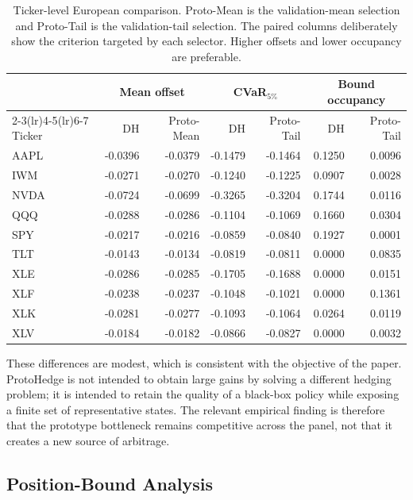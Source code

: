 \documentclass[sigconf]{acmart}
\begin{document}
\begin{table}[t]
\centering
\small
\setlength{\tabcolsep}{4.5pt}
\begin{tabular}{lrrrrrr}
\toprule
& \multicolumn{2}{c}{Mean offset} & \multicolumn{2}{c}{CVaR$_{5\%}$} &
\multicolumn{2}{c}{Bound occupancy} \\
\cmidrule(lr){2-3}\cmidrule(lr){4-5}\cmidrule(lr){6-7}
Ticker & DH & Proto-Mean & DH & Proto-Tail & DH & Proto-Tail \\
\midrule
AAPL & -0.0396 & -0.0379 & -0.1479 & -0.1464 & 0.1250 & 0.0096 \\
IWM  & -0.0271 & -0.0270 & -0.1240 & -0.1225 & 0.0907 & 0.0028 \\
NVDA & -0.0724 & -0.0699 & -0.3265 & -0.3204 & 0.1744 & 0.0116 \\
QQQ  & -0.0288 & -0.0286 & -0.1104 & -0.1069 & 0.1660 & 0.0304 \\
SPY  & -0.0217 & -0.0216 & -0.0859 & -0.0840 & 0.1927 & 0.0001 \\
TLT  & -0.0143 & -0.0134 & -0.0819 & -0.0811 & 0.0000 & 0.0835 \\
XLE  & -0.0286 & -0.0285 & -0.1705 & -0.1688 & 0.0000 & 0.0151 \\
XLF  & -0.0238 & -0.0237 & -0.1048 & -0.1021 & 0.0000 & 0.1361 \\
XLK  & -0.0281 & -0.0277 & -0.1093 & -0.1064 & 0.0264 & 0.0119 \\
XLV  & -0.0184 & -0.0182 & -0.0866 & -0.0827 & 0.0000 & 0.0032 \\
\bottomrule
\end{tabular}
\caption{Ticker-level European comparison. Proto-Mean is the
validation-mean selection and Proto-Tail is the validation-tail selection.
The paired columns deliberately show the criterion targeted by each selector.
Higher offsets and lower occupancy are preferable.}
\label{tab:european-ticker}
\end{table}

These differences are modest, which is consistent with the objective of the
paper. ProtoHedge is not intended to obtain large gains by solving a different
hedging problem; it is intended to retain the quality of a black-box policy
while exposing a finite set of representative states. The relevant empirical
finding is therefore that the prototype bottleneck remains competitive across
the panel, not that it creates a new source of arbitrage.

\subsection{Position-Bound Analysis}
\label{subsec:bound_results}
\end{document}
